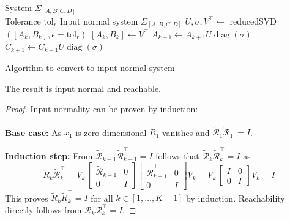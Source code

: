 \documentclass[doctype=mastersthesis,BCOR=15mm,biblatex]{ldvbook}%
\newcommand{\Input}{\Require}
\newcommand{\Output}{\Ensure}
\newcommand{\spaceIO}{\phantom{Output:Input}\hspace{-0.7cm}}
\DeclareMathOperator{\diag}{diag}
\newcommand{\R}{\mathcal{R}} %
\newcommand{\eye}{I} %
\begin{document}
\begin{algorithm}[htb]
	\begin{algorithmic}
	\Input System $\Sigma_{[A,B,C,D]}$\\
	\spaceIO Tolerance $\text{tol}_r$ 
	\Output Input normal system $\Sigma_{[A,B,C,D]}$
		\State $U,\sigma,V^\top \gets$ reducedSVD$([A_k,B_k],\epsilon=\text{tol}_r)$
		\State $[A_k,B_k] \gets V^\top$
		\State $A_{k+1}\gets A_{k+1}U\diag(\sigma)$
		\State $C_{k+1}\gets C_{k+1}U\diag(\sigma)$
	\EndFor
	\end{algorithmic}
\caption{Algorithm to convert to input normal system}\label{alg:inp_normal}
\end{algorithm}

The result is input normal and reachable.
\begin{proof}
	Input normality can be proven by induction:
	
	\noindent\textbf{Base case:}
	As $x_1$ is zero dimensional $R_1$ vanishes and 
	$\tilde{\R}_{1}\tilde{\R}_{1}^\top = \eye$.
	
	\noindent\textbf{Induction step:}
	From $\tilde{\R}_{k-1}\tilde{\R}_{k-1}^\top = \eye$ follows that $\tilde{\R}_k\tilde{\R}_k^\top = \eye$ as
	\begin{equation}\label{eq:induction_reach}
	\tilde{R}_k\tilde{\R}_k^\top
	=
	V_k^\top\begin{bmatrix}\tilde{\R}_{k-1} &0\\
		0& \eye \end{bmatrix}
	\begin{bmatrix}\tilde{\R}_{k-1}^\top &0\\
		0& \eye \end{bmatrix} V_k
	= 
	V_k^\top\begin{bmatrix}\eye &0\\
	0& \eye \end{bmatrix} V_k
	=
	\eye
	\end{equation}
	This proves $\tilde{R}_k\tilde{R}_k^\top = \eye$ for all $k \in [1,\dots,K-1]$ by induction.
	Reachability directly follows from $\R_k\R_k^\top = \eye$.
\end{proof}
\end{document}
